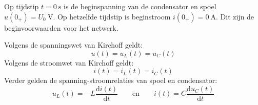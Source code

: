 Op tijdstip $t=\SI{0}{\second}$ is de beginspanning van de condensator en spoel $u(0_+)=U_0\ \si{\volt}$. Op hetzelfde tijdstip is beginstroom $i(0_+)=\SI{0}{\ampere}$. Dit zijn de beginvoorwaarden voor het netwerk.

Volgens de spanningswet van Kirchoff geldt:
\begin{equation}
u(t) = u_L(t) = u_C(t)
\end{equation}
%
Volgens de stroomwet van Kirchoff geldt:
%
\begin{equation}
i(t) = i_L(t) = i_C(t)
\end{equation}
%
Verder gelden de spanning-stroomrelaties van spoel en condensator:
%
\begin{equation}
u_L(t) = -L\dfrac{\mathrm{d}i(t)}{\mathrm{d}t} \qquad \text{en} \qquad i(t) = C\dfrac{\mathrm{d}u_C(t)}{\mathrm{d}t}
\end{equation}

